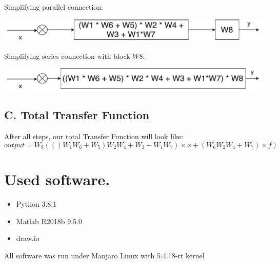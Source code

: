 \documentclass[a4paper,12pt]{article}
\begin{document}
    Simplifying parallel connection:
    \begin{center}
        \includegraphics[width=0.8\linewidth]{../Task5/T5Step8.pdf}
    \end{center}
    Simplifying series connection with block $W8$:
    \begin{center}
        \includegraphics[width=0.8\linewidth]{../Task5/T5Step9.pdf}
    \end{center}
    \subsection*{C. Total Transfer Function}
    After all steps, our total Transfer Function will look like:
    \begin{equation*}
        output = W_8(((W_1 W_6 + W_5) W_2 W_4 + W_3 + W_1 W_7) \times x + 
        (W_6 W_2 W_4 + W_7) \times f)
    \end{equation*}


\section{Used software.}
\begin{itemize}
    \item Python 3.8.1
    \item Matlab R2018b 9.5.0
    \item draw.io
\end{itemize}
All software was run under Manjaro Linux with 5.4.18-rt kernel
\end{document}
